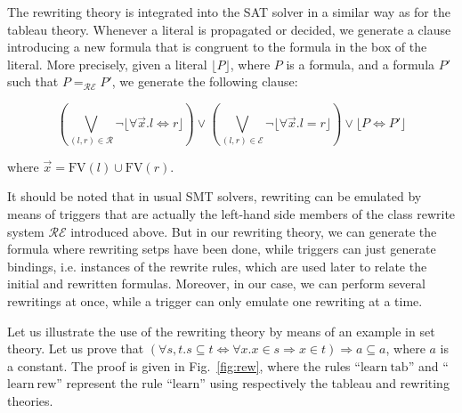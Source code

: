 The rewriting theory is integrated into the SAT solver in a similar way as for
the tableau theory. Whenever a literal is propagated or decided, we generate a
clause introducing a new formula that is congruent to the formula in the box of
the literal. More precisely, given a literal $\lfloor{}P\rfloor$, where $P$ is a
formula, and a formula $P'$ such that $P=_\mathcal{RE}P'$, we generate the
following clause:

$$\left(\bigvee_{(l,r)\in\mathcal{R}}
\neg\lfloor\forall{}\vec{x}.l\Leftrightarrow{}r\rfloor\right)\lor
\left(\bigvee_{(l,r)\in\mathcal{E}}\neg\lfloor\forall{}\vec{x}.l=r\rfloor\right)\lor
\lfloor{}P\Leftrightarrow{}P'\rfloor$$

where $\vec{x}=\mathrm{FV}(l)\cup\mathrm{FV}(r)$.

It should be noted that in usual SMT solvers, rewriting can be emulated by means
of triggers that are actually the left-hand side members of the class rewrite
system $\mathcal{RE}$ introduced above. But in our rewriting theory, we can
generate the formula where rewriting setps have been done, while triggers can just
generate bindings, i.e. instances of the rewrite rules, which are used later to
relate the initial and rewritten formulas. Moreover, in our case, we can perform
several rewritings at once, while a trigger can only emulate one rewriting at a
time.

Let us illustrate the use of the rewriting theory by means of an example in set
theory. Let us prove that
$(\forall{}s,t.s\subseteq{}t\Leftrightarrow{}\forall{}x.x\in{}s\Rightarrow{}
x\in{}t)\Rightarrow{}a\subseteq{}a$, where $a$ is a constant. The proof is given
in Fig.~\ref{fig:rew}, where the rules ``$\mathrm{learn~tab}$'' and
``$\mathrm{learn~rew}$'' represent the rule ``$\mathrm{learn}$'' using
respectively the tableau and rewriting theories.

